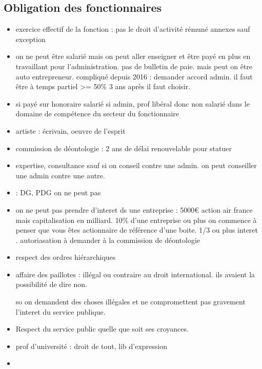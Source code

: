 \documentclass[a4paper,12pt]{article}
\begin{document}
\subsection{Obligation des fonctionnaires}
\begin{itemize}
	\item exercice effectif de la fonction : pas le droit d'activité rémuné annexes sauf exception 
	\item on ne peut être salarié mais on peut aller enseigner et être payé en plus en travaillant pour l'administration.
	pas de bulletin de paie. mais peut on être auto entrepreneur. compliqué depuis 2016 : demander accord admin.
	il faut être à temps partiel >= 50\%   3 ans après il faut choisir.
	\item si payé sur honoraire salarié si admin, prof libéral donc non salarié dans le domaine de compétence
	du secteur du fonctionnaire
	
	\item artiste : écrivain, oeuvre de l'esprit
	\item commission de déontologie : 2 ans de délai renouvelable pour statuer
	\item expertise, consultance sauf si on conseil contre une admin.
	on peut conseiller une admin contre une autre.
	\item : DG, PDG on ne peut pas
	\item on ne peut pas prendre d'interet ds une entreprise : 5000€ action air france mais capitalisation en milliard.
	10\% d'une entreprise ou plus on commence à penser que vous êtes actionnaire de référence d'une boite. 1/3 ou plus
	interet . 
	autoriasation à demander à la commission de déontologie
\end{itemize}

\begin{itemize}
	\item respect des ordres hiérarchiques
	
\item affaire des paillotes  : illégal ou contraire au droit international.
ils avaient la possibilité de dire non.

so on demandent des choses illégales et ne compromettent pas gravement l'interet du service publique.  
\end{itemize}


\begin{itemize}
	\item Respect du service public quelle que soit ses croyances.
	\item prof d'université : droit de tout, lib d'expression
	\item 
\end{itemize}
 
\end{document}
